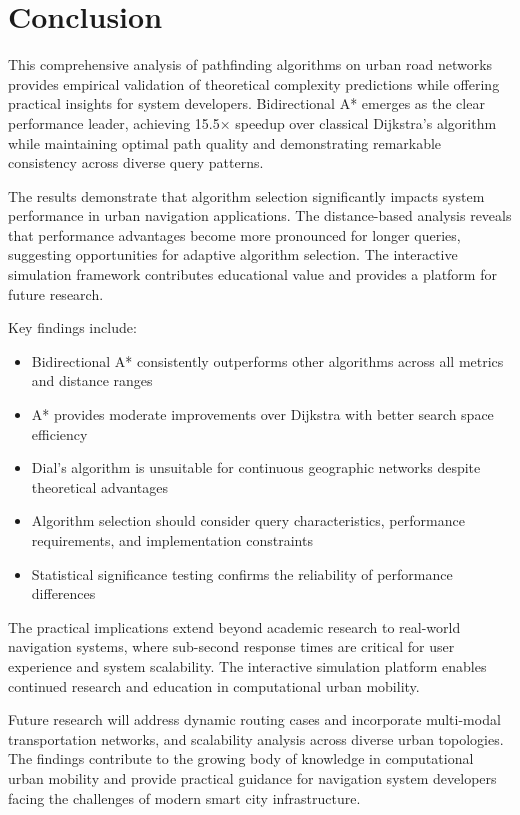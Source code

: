 \documentclass[conference]{IEEEtran}
\begin{document}
\section{Conclusion}

This comprehensive analysis of pathfinding algorithms on urban road networks provides empirical validation of theoretical complexity predictions while offering practical insights for system developers. Bidirectional A* emerges as the clear performance leader, achieving 15.5× speedup over classical Dijkstra's algorithm while maintaining optimal path quality and demonstrating remarkable consistency across diverse query patterns.

The results demonstrate that algorithm selection significantly impacts system performance in urban navigation applications. The distance-based analysis reveals that performance advantages become more pronounced for longer queries, suggesting opportunities for adaptive algorithm selection. The interactive simulation framework contributes educational value and provides a platform for future research.

Key findings include:
\begin{itemize}
\item Bidirectional A* consistently outperforms other algorithms across all metrics and distance ranges
\item A* provides moderate improvements over Dijkstra with better search space efficiency
\item Dial's algorithm is unsuitable for continuous geographic networks despite theoretical advantages
\item Algorithm selection should consider query characteristics, performance requirements, and implementation constraints
\item Statistical significance testing confirms the reliability of performance differences
\end{itemize}

The practical implications extend beyond academic research to real-world navigation systems, where sub-second response times are critical for user experience and system scalability. The interactive simulation platform enables continued research and education in computational urban mobility.

Future research will address dynamic routing cases and incorporate multi-modal transportation networks, and scalability analysis across diverse urban topologies. The findings contribute to the growing body of knowledge in computational urban mobility and provide practical guidance for navigation system developers facing the challenges of modern smart city infrastructure.
\end{document}
